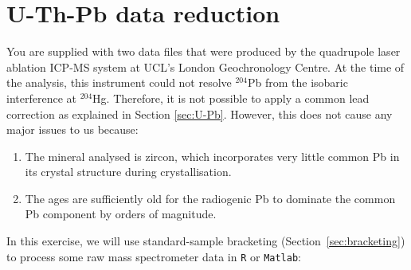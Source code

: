 \section{U-Th-Pb data reduction}
\label{sec:U-Pb-R}

You are supplied with two data files that were produced by the
quadrupole laser ablation ICP-MS system at UCL's London Geochronology
Centre. At the time of the analysis, this instrument could not resolve
$^{204}$Pb from the isobaric interference at $^{204}$Hg. Therefore, it
is not possible to apply a common lead correction as explained in
Section \ref{sec:U-Pb}. However, this does not cause any major issues
to us because:

\begin{enumerate}
\item The mineral analysed is zircon, which incorporates very little
  common Pb in its crystal structure during crystallisation.
\item The ages are sufficiently old for the radiogenic Pb to dominate
  the common Pb component by orders of magnitude.
\end{enumerate}

In this exercise, we will use standard-sample bracketing
(Section~\ref{sec:bracketing}) to process some raw mass spectrometer
data in \texttt{R} \ifuclnotes or \texttt{Matlab}\fi:

